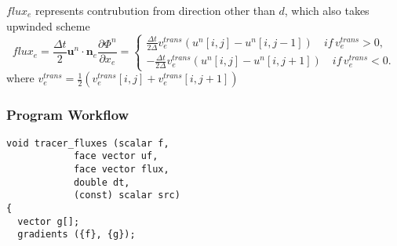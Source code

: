 \documentclass[a4paper]{article}
\newcommand{\para}[1]{\textbf{\emph{\textcolor{para}{#1}}}}
\begin{document}
$flux_e$ represents contrubution from direction other than $d$, which also takes upwinded scheme
\begin{equation}
    flux_e = \frac{\Delta t}{2} \mathbf{u}^n\cdot\mathbf{n}_e \frac{\partial \Phi^n}{\partial x_e}=\left \{ 
    \begin{array}{cc}
      \frac{\Delta t}{2\Delta} v_{e}^{trans}(u^n[i,j]-u^n[i,j-1])\quad if\,v_{e}^{trans}>0,\\
      -\frac{\Delta t}{2\Delta} v_e^{trans}(u^n[i,j]-u^n[i,j+1])\quad if\,v_e^{trans}<0.
    \end{array}
    \right.
\end{equation}
where $v_e^{trans} = \frac{1}{2}(v_e^{trans}[i,j]+v_e^{trans}[i,j+1])$
\subsubsection{Program Workflow}
\begin{multicols}{2}
 \columnbreak
 \begin{verbatim}
void tracer_fluxes (scalar f,
		    face vector uf,
		    face vector flux,
		    double dt,
		    (const) scalar src)
{
  vector g[];
  gradients ({f}, {g});
 \end{verbatim}
\end{multicols}

\begin{center}
\end{center}
\end{document}
